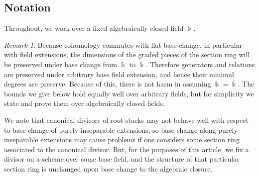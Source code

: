 \documentclass{amsart}
\theoremstyle{plain}
\theoremstyle{definition}
\theoremstyle{remark}
\newtheorem{rem}[thm]{Remark}
\numberwithin{equation}{section}
\newcommand\bk{{\Bbbk}}
\begin{document}
\subsection{Notation}
Throughout, we work over a fixed algebraically closed field $\bk$.
\begin{rem}
	Because cohomology commutes with flat base change, in particular with field extensions,
the dimensions of the graded pieces of the section ring will be preserved under base change from $\bk$ to $\overline \bk$. Therefore generators
and relations are preserved under arbitrary base field extension, and hence their minimal degrees are preserve.
Because of this, there is not harm in assuming $\bk =\overline \bk$. The bounds we give below hold equally well
over arbitrary fields, but for simplicity we state and prove them over algebraically closed fields.

We note that canonical divisors of root stacks may not behave well with respect to base change of purely inseparable extensions,
so base change along purely inseparable extensions may cause problems if one considers 
some section ring associated to the canonical divisor.
But, for the purposes of this article, we fix a divisor on a scheme over some base field, and the structure of that particular section
ring is unchanged upon base change to the algebraic closure.
\end{rem}
\end{document}
